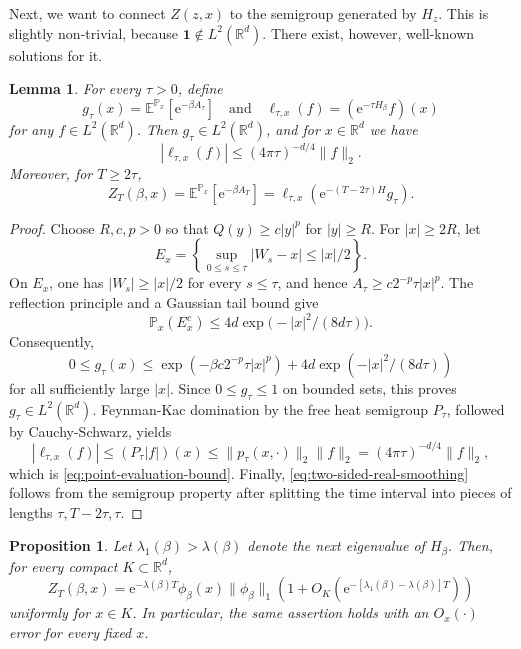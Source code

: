 \documentclass[11pt,reqno]{amsart}
\newtheorem{proposition}[theorem]{Proposition}
\newtheorem{lemma}[theorem]{Lemma}
\theoremstyle{definition}
\numberwithin{equation}{section}
\newcommand{\<}{\langle}
\renewcommand{\>}{\rangle}
\def\prob{{\mathbb P}}
\begin{document}
Next, we want to connect $Z(z,x)$ to the semigroup generated by $H_z$. This is slightly non-trivial, because $\mathbf 1\notin L^2(\mathbb R^d)$. There exist, however, well-known solutions for it.

\begin{lemma}
\label{lem:real-boundary-smoothing}
For every  $\tau>0 $, define
\[
 g_\tau(x)=\mathbb E^{\prob_x}[\mathrm e^{-\beta A_\tau}]
 \quad\text{and}\quad
 \ell_{\tau,x}(f)=(\mathrm e^{-\tau H_\beta}f)(x)
\]
for any $f\in L^2(\mathbb R^d)$.
Then  $g_\tau\in L^2(\mathbb R^d) $, and for $x\in\mathbb R^d$ we have
\begin{equation}
 |\ell_{\tau,x}(f)|\le (4\pi\tau)^{-d/4}\|f\|_2.
 \label{eq:point-evaluation-bound}
\end{equation}
Moreover, for  $T\ge 2\tau $,
\begin{equation}
 Z_T(\beta,x)=\mathbb E^{\prob_x}[\mathrm e^{-\beta A_T}]
 =\ell_{\tau,x}\!\left(\mathrm e^{-(T-2\tau)H}g_\tau\right).
 \label{eq:two-sided-real-smoothing}
\end{equation}
\end{lemma}
\begin{proof}
Choose  $R,c,p>0 $ so that  $Q(y)\ge c|y|^p $ for  $|y|\ge R $.
For  $|x|\ge 2R $, let
\[
 E_x=\left\{\sup_{0\le s\le\tau}|W_s-x|\le |x|/2\right\}.
\]
On  $E_x $, one has  $|W_s|\ge |x|/2 $ for every  $s\le\tau $, and hence
 $A_\tau\ge c2^{-p}\tau|x|^p $.  The reflection principle and a Gaussian
tail bound give
\[
 \mathbb P_x(E_x^c)
 \le 4d\exp \big(-|x|^2/(8d\tau)\big).
\]
Consequently,
\begin{equation}
\nonumber
 0\le g_\tau(x)
 \le \exp(-\beta c2^{-p}\tau|x|^p)
      +4d\exp(-|x|^2/(8d\tau))
 \label{eq:g-tau-decay}
\end{equation}
for all sufficiently large  $|x| $.  Since  $0\le g_\tau\le1 $ on bounded
sets, this proves  $g_\tau\in L^2(\mathbb R^d) $.
Feynman-Kac domination by the free heat semigroup  $P_\tau $, followed by
Cauchy-Schwarz, yields
\[
 |\ell_{\tau,x}(f)|
 \le (P_\tau|f|)(x)
 \le \|p_\tau(x,\cdot)\|_2\|f\|_2
 =(4\pi\tau)^{-d/4}\|f\|_2,
\]
which is \eqref{eq:point-evaluation-bound}.  Finally,
\eqref{eq:two-sided-real-smoothing} follows from the semigroup property after splitting the time interval into pieces of
lengths  $\tau,T-2\tau,\tau $.
\end{proof}

\begin{proposition}
\label{prop:partition-asymptotic-rigorous}
Let  $\lambda_1(\beta)>\lambda(\beta) $ denote the next eigenvalue of
 $H_\beta $.  Then, for every compact  $K\subset\mathbb R^d $,
\begin{equation}
 Z_T(\beta,x)
 =\mathrm e^{-\lambda(\beta)T}\phi_\beta(x)\|\phi_\beta\|_1
 \left(1+O_K\!\left(\mathrm e^{-[\lambda_1(\beta)-\lambda(\beta)]T}\right)\right)
 \label{eq:partition-asymptotic-rigorous}
\end{equation}
uniformly for  $x\in K $.  In particular, the same assertion holds with
an  $O_x(\cdot) $ error for every fixed  $x $.
\end{proposition}
\end{document}
